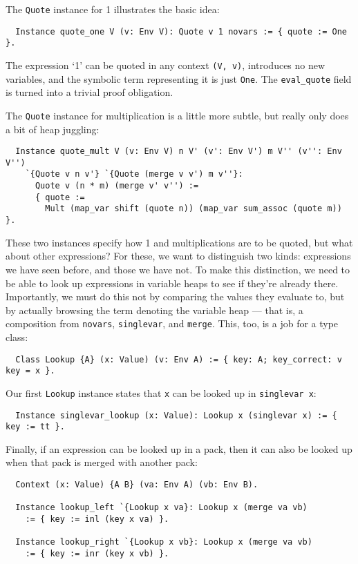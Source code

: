 \documentclass[a4paper,10pt,runningheads]{llncs}
\begin{document}
The \lstinline|Quote| instance for 1 illustrates the basic idea:
\begin{lstlisting}
  Instance quote_one V (v: Env V): Quote v 1 novars := { quote := One }.
\end{lstlisting}
The expression `1' can be quoted in any context \lstinline|(V, v)|, introduces no new variables, and the symbolic term representing it is just \lstinline|One|. The \lstinline|eval_quote| field is turned into a trivial proof obligation.

The \lstinline|Quote| instance for multiplication is a little more subtle, but really only does a bit of heap juggling:
\begin{lstlisting}
  Instance quote_mult V (v: Env V) n V' (v': Env V') m V'' (v'': Env V'')
    `{Quote v n v'} `{Quote (merge v v') m v''}:
      Quote v (n * m) (merge v' v'') :=
      { quote :=
        Mult (map_var shift (quote n)) (map_var sum_assoc (quote m)) }.
\end{lstlisting}

These two instances specify how 1 and multiplications are to be quoted, but what about other expressions? For these, we want to distinguish two kinds: expressions we have seen before, and those we have not. To make this distinction, we need to be able to look up expressions in variable heaps to see if they're already there. Importantly, we must do this not by comparing the values they evaluate to, but by actually browsing the term denoting the variable heap --- that is, a composition from \lstinline|novars|, \lstinline|singlevar|, and \lstinline|merge|. This, too, is a job for a type class:
\begin{lstlisting}
  Class Lookup {A} (x: Value) (v: Env A) := { key: A; key_correct: v key = x }.
\end{lstlisting}
Our first \lstinline|Lookup| instance states that \lstinline|x| can be looked up in \lstinline|singlevar x|:
\begin{lstlisting}
  Instance singlevar_lookup (x: Value): Lookup x (singlevar x) := { key := tt }.
\end{lstlisting}
Finally, if an expression can be looked up in a pack, then it can also be looked up when that pack is merged with another pack:
\begin{lstlisting}
  Context (x: Value) {A B} (va: Env A) (vb: Env B).

  Instance lookup_left `{Lookup x va}: Lookup x (merge va vb)
    := { key := inl (key x va) }.

  Instance lookup_right `{Lookup x vb}: Lookup x (merge va vb)
    := { key := inr (key x vb) }.
\end{lstlisting}
\end{document}

